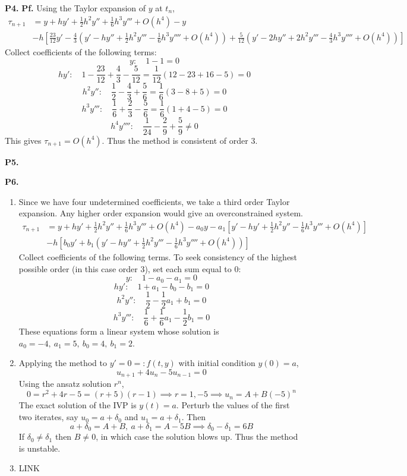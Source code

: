 \documentclass{article}
\def\tbf#1{\textbf{#1}}
\newcommand{\br}[1]{\left(#1\right)}
\newcommand{\sbr}[1]{\left[#1\right]}
\newcommand{\pf}{\tbf{Pf. }}
\newcommand{\imp}{\implies}
\newcommand{\sep}[1][.5cm]{\vspace{#1}}
\begin{document}
\tbf{P4.} \pf Using the Taylor expansion of $y$ at $t_n$,
\begin{align*}
	\tau_{n+1} &= y + hy' + \frac12h^2y'' + \frac16h^3y''' + O(h^4) - y \\
	& - h\sbr{\frac{23}{12}y' - \frac43\br{y' - hy'' + \frac12h^2y''' - \frac16h^3y'''' + O(h^4)} + \frac{5}{12}\br{y' - 2hy'' + 2h^2y''' - \frac43h^3y'''' + O(h^4)}}
\end{align*}
Collect coefficients of the following terms:
$$y: \quad 1 - 1 = 0$$
$$hy': \quad 1 - \frac{23}{12} + \frac43 - \frac{5}{12} = \frac{1}{12}(12-23+16-5) = 0$$
$$h^2y'': \quad \frac12 - \frac43 + \frac56 = \frac16(3-8+5) = 0$$
$$h^3y''': \quad \frac16 + \frac23 - \frac56 = \frac16(1+4-5) = 0$$
$$h^4y'''': \quad \frac{1}{24} - \frac29 + \frac59 \ne 0$$
This gives $\tau_{n+1}=O(h^4)$. Thus the method is consistent of order 3.
\sep



\tbf{P5.} 



\tbf{P6.}

\begin{enumerate}[label=(\alph*)]
	
\item Since we have four undetermined coefficients, we take a third order Taylor expansion. Any higher order expansion would give an overconstrained system.
\begin{align*}
	\tau_{n+1} &= y + hy' + \frac12h^2y'' + \frac16h^3y''' + O(h^4) - a_0y - a_1\sbr{y' - hy' + \frac12h^2y'' - \frac16h^3y''' + O(h^4)}\\
	& - h\sbr{b_0y' + b_1(y' - hy'' + \frac12h^2y''' - \frac16h^3y'''' + O(h^4))}
\end{align*}
Collect coefficients of the following terms. To seek consistency of the highest possible order (in this case order 3), set each sum equal to 0:
$$y: \quad 1 - a_0 - a_1 = 0$$
$$hy': \quad 1 + a_1 - b_0 - b_1 = 0$$
$$h^2y'': \quad \frac12 - \frac12a_1 + b_1 = 0$$
$$h^3y''': \quad \frac16+ \frac16a_1 - \frac12b_1 = 0$$
These equations form a linear system whose solution is $a_0=-4,~a_1=5,~b_0=4,~b_1=2$.


\item Applying the method to $y'=0=:f(t,y)$ with initial condition $y(0)=a$,
$$u_{n+1} + 4u_n - 5u_{n-1} = 0$$
Using the ansatz solution $r^n$,
$$0 = r^2+4r-5 = (r+5)(r-1)
\imp r=1,-5
\imp u_n = A + B(-5)^n$$
The exact solution of the IVP is $y(t)=a$. Perturb the values of the first two iterates, say $u_0=a+\delta_0$ and $u_1=a+\delta_1$. Then
$$a+\delta_0 = A+B,~a+\delta_1 = A-5B
\imp \delta_0 - \delta_1 = 6B$$
If $\delta_0\ne\delta_1$ then $B\ne0$, in which case the solution blows up. Thus the method is unstable.

\item LINK

\end{enumerate}
\end{document}
